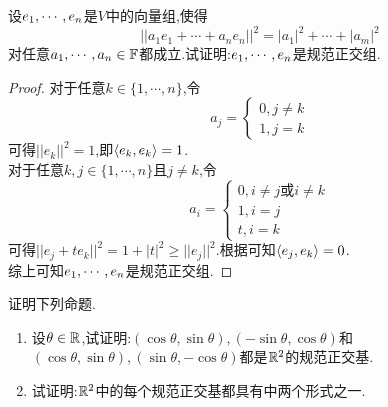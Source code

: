 \documentclass{ctexart}
\begin{document}
\pagestyle{empty}
\begin{center}
    \large{}
\end{center}
\begin{problem}[1.]
    设${e}_1,\cdots,{e}_{n}$是$V$中的向量组,使得
    \[||a_1e_1+\cdots+a_ne_n||^2=|a_1|^2+\cdots+|a_m|^2\]
    对任意${a}_1,\cdots,{a}_{n}\in\mathbb{F}$都成立.试证明:${e}_1,\cdots,{e}_{n}$是规范正交组.
\end{problem}
\begin{proof}
    对于任意$k\in\{1,\cdots,n\}$,令
    \[a_j=\left\{\begin{array}{l}
        0,j\neq k\\
        1,j=k
    \end{array}\right.\]
    可得$||e_k||^2=1$,即$\left\langle{e_k},{e_k}\right\rangle=1$.\\
    对于任意$k,j\in\{1,\cdots,n\}$且$j\neq k$,令
    \[a_i=\left\{\begin{array}{l}
        0,i\neq j\text{或}i\neq k\\
        1,i=j\\
        t,i=k
    \end{array}\right.\]
    可得$||e_j+te_k||^2=1+|t|^2\geqslant||e_j||^2$.根据可知$\left\langle{e_j},{e_k}\right\rangle=0$.\\
    综上可知${e}_1,\cdots,{e}_{n}$是规范正交组.
\end{proof}
\begin{problem}[2.]
    证明下列命题.
    \begin{enumerate}[label=\tbf{(\arabic*)}]
        \item 设$\theta\in\mathbb{R}$,试证明:$(\cos\theta,\sin\theta),(-\sin\theta,\cos\theta)$和$(\cos\theta,\sin\theta),(\sin\theta,-\cos\theta)$都是$\mathbb{R}^2$的规范正交基.
        \item 试证明:$\mathbb{R}^2$中的每个规范正交基都具有中两个形式之一.
    \end{enumerate}
\end{problem}
\end{document}
